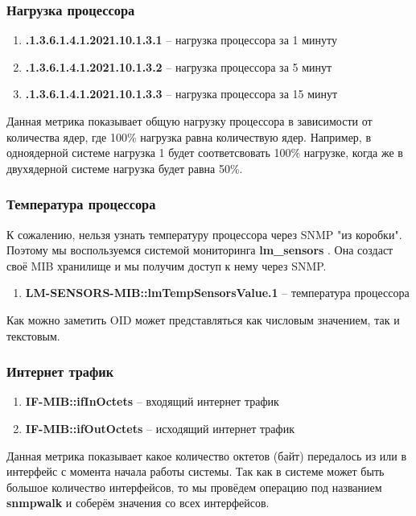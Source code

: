 \subsubsection*{Нагрузка процессора}

\begin{enumerate}
    \item \textbf{.1.3.6.1.4.1.2021.10.1.3.1} -- нагрузка процессора за 1 минуту
    \item \textbf{.1.3.6.1.4.1.2021.10.1.3.2} -- нагрузка процессора за 5 минут
    \item \textbf{.1.3.6.1.4.1.2021.10.1.3.3} -- нагрузка процессора за 15 минут
\end{enumerate}

Данная метрика показывает общую нагрузку процессора в зависимости от количества ядер, где
100\% нагрузка равна количествую ядер. Например, в одноядерной системе нагрузка 1 будет соответсвовать
100\% нагрузке, когда же в двухядерной системе нагрузка будет равна 50\%.

\subsubsection*{Температура процессора}

К сожалению, нельзя узнать температуру процессора через SNMP "из коробки". Поэтому
мы воспользуемся системой мониторинга \textbf{lm\_sensors} \cite{archlinuxLm}. Она создаст своё MIB хранилище
и мы получим доступ к нему через SNMP.

\begin{enumerate}
    \item \textbf{LM-SENSORS-MIB::lmTempSensorsValue.1} -- температура процессора
\end{enumerate}

Как можно заметить OID может представляться как числовым значением, так и текстовым.

\subsubsection*{Интернет трафик}

\begin{enumerate}
    \item \textbf{IF-MIB::ifInOctets} -- входящий интернет трафик
    \item \textbf{IF-MIB::ifOutOctets} -- исходящий интернет трафик
\end{enumerate}

Данная метрика показывает какое количество октетов (байт) передалось из или в интерфейс с момента
начала работы системы. Так как в системе может быть большое количество интерфейсов, то мы провёдем
операцию под названием \textbf{snmpwalk} и соберём значения со всех интерфейсов.

